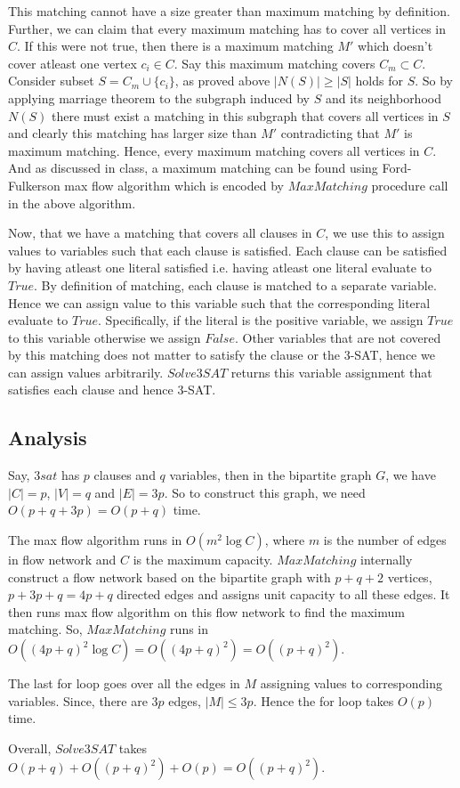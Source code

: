 \documentclass{article}
\begin{document}
    This matching cannot have a size greater than maximum matching by definition. Further, we can claim that every maximum matching has to cover all vertices in $C$. If this were not true, then there is a maximum matching $M'$ which doesn't cover atleast one vertex $c_i \in C$. Say this maximum matching covers $C_m \subset C$. Consider subset $S = C_m \cup \{c_i\}$, as proved above $|N(S)| \ge |S|$ holds for $S$. So by applying marriage theorem to the subgraph induced by $S$ and its neighborhood $N(S)$ there must exist a matching in this subgraph that covers all vertices in $S$ and clearly this matching has larger size than $M'$ contradicting that $M'$ is maximum matching. Hence, every maximum matching covers all vertices in $C$. And as discussed in class, a maximum matching can be found using Ford-Fulkerson max flow algorithm which is encoded by $MaxMatching$ procedure call in the above algorithm.
    
    Now, that we have a matching that covers all clauses in $C$, we use this to assign values to variables such that each clause is satisfied. Each clause can be satisfied by having atleast one literal satisfied i.e. having atleast one literal evaluate to $True$. By definition of matching, each clause is matched to a separate variable. Hence we can assign value to this variable such that the corresponding literal evaluate to $True$. Specifically, if the literal is the positive variable, we assign $True$ to this variable otherwise we assign $False$. Other variables that are not covered by this matching does not matter to satisfy the clause or the 3-SAT, hence we can assign values arbitrarily. $Solve3SAT$ returns this variable assignment that satisfies each clause and hence 3-SAT.

    \subsection*{Analysis}
    Say, $3sat$ has $p$ clauses and $q$ variables, then in the bipartite graph $G$, we have $|C| = p$, $|V| = q$ and $|E| = 3p$. So to construct this graph, we need $O(p + q + 3p) = O(p+q)$ time.

    The max flow algorithm runs in $O(m^2 \log C)$, where $m$ is the number of edges in flow network and $C$ is the maximum capacity. $MaxMatching$ internally construct a flow network based on the bipartite graph with $p+q+2$ vertices, $p+3p+q = 4p+q$ directed edges and assigns unit capacity to all these edges. It then runs max flow algorithm on this flow network to find the maximum matching. So, $MaxMatching$ runs in $O((4p+q)^2 \log C) = O((4p+q)^2) = O((p+q)^2)$.

    The last for loop goes over all the edges in $M$ assigning values to corresponding variables. Since, there are $3p$ edges, $|M| \le 3p$. Hence the for loop takes $O(p)$ time.

    Overall, $Solve3SAT$ takes $O(p+q) + O((p+q)^2) + O(p) = O((p+q)^2)$.
\end{document}
